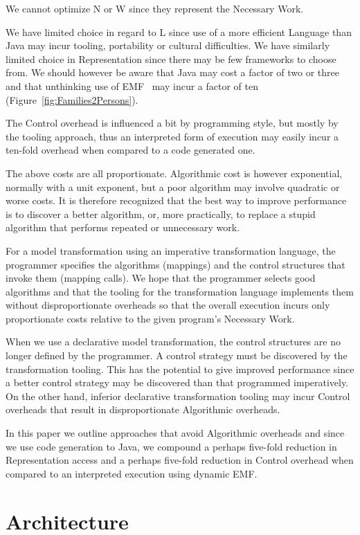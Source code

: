 \documentclass{llncs}
\begin{document}
We cannot optimize N or W since they represent the Necessary Work.

We have limited choice in regard to L since use of a more efficient Language than Java may incur tooling, portability or cultural difficulties. We have similarly limited choice in Representation since there may be few frameworks to choose from. We should however be aware that Java may cost a factor of two or three and that unthinking use of EMF~\cite{Eclipse-EMF} may incur a factor of ten (Figure~\ref{fig:Families2Persons}).

The Control overhead is influenced a bit by programming style, but mostly by the tooling approach, thus an interpreted form of execution may easily incur a ten-fold overhead when compared to a code generated one.

The above costs are all proportionate. Algorithmic cost is however exponential, normally with a unit exponent, but a poor algorithm may involve quadratic or worse costs. It is therefore recognized that the best way to improve performance is to discover a better algorithm, or, more practically, to replace a stupid algorithm that performs repeated or unnecessary work.

For a  model transformation using an imperative transformation language, the programmer specifies the algorithms (mappings) and the control structures that invoke them (mapping calls). We hope that the programmer selects good algorithms and that the tooling for the transformation language implements them without disproportionate overheads so that the overall execution incurs only proportionate costs relative to the given program's Necessary Work.

When we use a declarative model transformation, the control structures are no longer defined by the programmer. A control strategy must be discovered by the transformation tooling. This has the potential to give improved performance since a better control strategy may be discovered than that programmed imperatively. On the other hand, inferior declarative transformation tooling may incur Control overheads that result in disproportionate Algorithmic overheads.

In this paper we outline approaches that avoid Algorithmic overheads and since we use code generation to Java, we compound a perhaps five-fold reduction in Representation access and a perhaps five-fold reduction in Control overhead when compared to an interpreted execution using dynamic EMF.

\section{Architecture}\label{Architecture}
\end{document}
